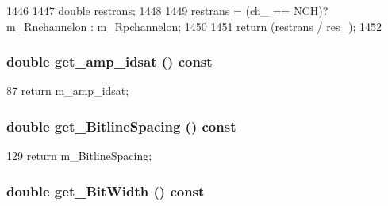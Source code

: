 \begin{DoxyCode}
1446 {
1447     double restrans;
1448 
1449     restrans = (ch_ == NCH)? m_Rnchannelon : m_Rpchannelon;
1450 
1451     return (restrans / res_);
1452 }
\end{DoxyCode}
\hypertarget{classTechParameter_a2e07e540b5a06c5935908a4bcfbd597a}{
\subsubsection[{get\_\-amp\_\-idsat}]{\setlength{\rightskip}{0pt plus 5cm}double get\_\-amp\_\-idsat () const}}
\label{classTechParameter_a2e07e540b5a06c5935908a4bcfbd597a}



\begin{DoxyCode}
87 { return m_amp_idsat; }
\end{DoxyCode}
\hypertarget{classTechParameter_aafc853eac37f360c07f4797e6e9d60b2}{
\subsubsection[{get\_\-BitlineSpacing}]{\setlength{\rightskip}{0pt plus 5cm}double get\_\-BitlineSpacing () const}}
\label{classTechParameter_aafc853eac37f360c07f4797e6e9d60b2}



\begin{DoxyCode}
129 { return m_BitlineSpacing; }
\end{DoxyCode}
\hypertarget{classTechParameter_afe14a6080452851a379b4603f8f4c5a9}{
\subsubsection[{get\_\-BitWidth}]{\setlength{\rightskip}{0pt plus 5cm}double get\_\-BitWidth () const}}
\label{classTechParameter_afe14a6080452851a379b4603f8f4c5a9}



